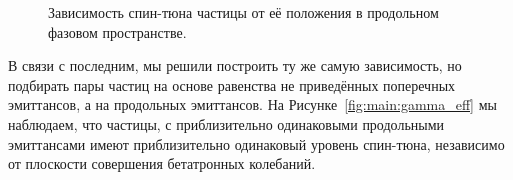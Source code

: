 \begin{figure}[h]
  \centering
  \caption{Зависимость спин-тюна частицы от её положения в продольном фазовом пространстве.\label{fig:main}}
\end{figure}

В связи с последним, мы решили построить ту же самую зависимость, но подбирать пары частиц на основе равенства не приведённых поперечных эмиттансов, а на продольных эмиттансов. На Рисунке~\ref{fig:main:gamma_eff} мы наблюдаем, что частицы, с приблизительно одинаковыми продольными эмиттансами имеют приблизительно одинаковый уровень спин-тюна, независимо от плоскости совершения бетатронных колебаний.

